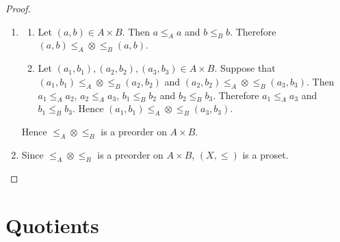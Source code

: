 \documentclass{book}
\begin{document}
	\begin{proof}\
		\begin{enumerate}
			\item 
			\begin{enumerate}
				\item Let $(a, b) \in A \times B$. Then $a \leq_A a$ and $b \leq_B b$. Therefore $(a, b) \leq_A \otimes \leq_B (a ,b)$.
				\item Let $(a_1, b_1), (a_2, b_2), (a_3, b_3) \in A \times B$. Suppose that $(a_1, b_1) \leq_A \otimes \leq_B (a_2, b_2)$ and $(a_2, b_2) \leq_A \otimes \leq_B (a_3, b_3)$. Then $a_1 \leq_A a_2$, $a_2 \leq_A a_3$, $b_1 \leq_B b_2$ and $b_2 \leq_B b_3$. Therefore $a_1 \leq_A a_3$ and $b_1 \leq_B b_3$. Hence $(a_1, b_1) \leq_A \otimes \leq_B (a_3, b_3)$.
			\end{enumerate}
			Hence $\leq_A \otimes \leq_B$ is a preorder on $A \times B$.
			\item Since $\leq_A \otimes \leq_B$ is a preorder on $A \times B$, $(X, \leq)$ is a proset.
		\end{enumerate}
	\end{proof}
	
	
	
	
	
	
	
	
	
	
	
	
	
	
	
	
	
	
	
	
	
	
	
	
	
	
	
	
	
	
	
	
	
	
	
	
	
	
	
	
	
	
	
	
	
	
	
	
	\section{Quotients}
	
	
	
	
	
	
	
	
	
\end{document}
